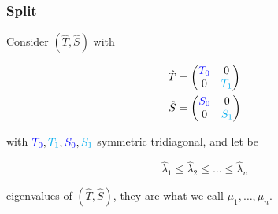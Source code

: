 \documentclass{beamer}
\theoremstyle{definition} \newtheorem{de}{Def}
\theoremstyle{remark} \newtheorem{os}[de]{Remark}
\theoremstyle{plain} \newtheorem{te}[de]{Teo}
\theoremstyle{plain} \newtheorem{co}[de]{Cor}
\theoremstyle{plain} \newtheorem{pr}[de]{Prop}
\theoremstyle{plain} \newtheorem{lem}[de]{Lemm}
\theoremstyle{remark} \newtheorem{rem}[de]{Remark}
\begin{document}
\begin{frame}
\frametitle{Split}

Consider $(\hat T, \hat S)$ with

\begin{align*}
 \hat T &= \begin{pmatrix} \textcolor{blue}{T_{0}} & 0\\ 0 & \textcolor{cyan}{T_{1}} \end{pmatrix}\\
 \hat S &= \begin{pmatrix} \textcolor{blue}{S_{0}} & 0\\ 0 & \textcolor{cyan}{S_{1}} \end{pmatrix}\\
\end{align*}

with $\textcolor{blue}{T_0}, \textcolor{cyan}{T_1}, \textcolor{blue}{S_0}, \textcolor{cyan}{S_1}$ symmetric tridiagonal, and let be

\begin{equation*}
  \hat\lambda_1 \le \hat\lambda_2 \le \dots \le \hat\lambda_n
\end{equation*}

eigenvalues of $(\hat T, \hat S)$, they are what we call $\mu_1,\dots,\mu_n$.

\end{frame}
\end{document}
